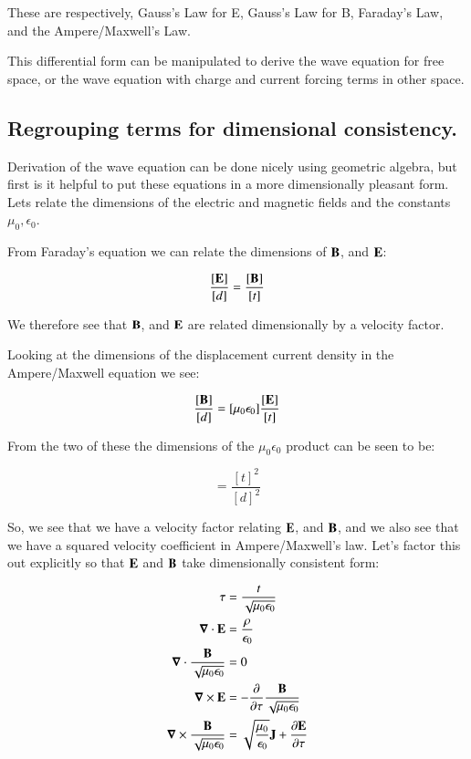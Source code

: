 \documentclass{article}
\newcommand{\spacegrad}[0]{\boldsymbol{\nabla}}
\begin{document}
These are respectively, Gauss's Law for E, Gauss's Law for B, Faraday's Law, and the Ampere/Maxwell's Law.

This differential form can be manipulated to derive the wave equation for free space, or the wave equation with charge and current forcing terms in other space.

\subsection{ Regrouping terms for dimensional consistency. }

Derivation of the wave equation can be done nicely using geometric algebra, but first is it helpful to put these equations in a more dimensionally pleasant form.
Lets relate the dimensions of the electric and magnetic fields and the constants $\mu_0, \epsilon_0$.

From Faraday's equation we can relate the dimensions of
$\mathbf{B}$, and $\mathbf{E}$:

\begin{equation}
\frac{[\mathbf{E}]}{[d]} = \frac{[\mathbf{B}]}{[t]}
\end{equation}

We therefore see that $\mathbf{B}$, and $\mathbf{E}$ are related dimensionally by a velocity factor.

Looking at the dimensions of the displacement current density in the Ampere/Maxwell equation we see:

\begin{equation}
\frac{[\mathbf{B}]}{[d]} = [\mu_0\epsilon_0] \frac{[\mathbf{E}]}{[t]}
\end{equation}

From the two of these the dimensions of the $\mu_0\epsilon_0$ product can be seen to be:

\begin{equation}
[\mu_0\epsilon_0] = \frac{{[t]}^2}{{[d]}^2}
\end{equation}

So, we see that we have a velocity factor relating $\mathbf{E}$, and $\mathbf{B}$, and we also see that we have a squared velocity coefficient in Ampere/Maxwell's law.  Let's factor this out explicitly so that $\mathbf{E}$ and $\mathbf{B}$ take dimensionally consistent form:

\begin{align}
\tau &= \frac{t}{\sqrt{\mu_0\epsilon_0}}  \\
\spacegrad \cdot \BE &= \frac{\rho}{\epsilon_0} \\
\spacegrad \cdot \frac{\BB}{\sqrt{\mu_0\epsilon_0}} &= 0 \\
\spacegrad \cross \BE &= - \frac{\partial}{\partial \tau} \frac{\BB}{\sqrt{\mu_0\epsilon_0}} \\
\spacegrad \cross \frac{\BB}{\sqrt{\mu_0\epsilon_0}} &= \sqrt{\frac{\mu_0}{\epsilon_0}} \BJ + \frac{\partial \BE}{\partial \tau}
\end{align}
\end{document}

